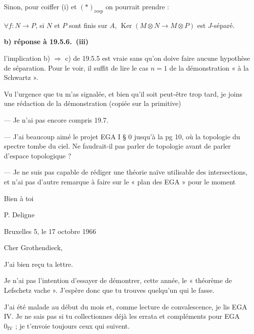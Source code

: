 \documentclass[11pt,a4paper]{article}
\begin{document}
Sinon, pour coiffer (i) et $(*)_{\mathrm{resp}}$ on pourrait prendre :

$\forall f : N \to P$, si $N$ et $P$ sont finis sur $A$,
$\operatorname{Ker}(M \otimes N \to M \otimes P)$ est $J$-séparé.
\marginal{!}


\textbf{b) réponse à 19.5.6.\ (iii)}

l'implication b) $\Rightarrow$ c) de 19.5.5 est vraie sans qu'on doive
faire aucune hypothèse de séparation. Pour le voir, il suffit de lire le
cas $n = 1$ de la démonstration « à la Schwartz ».

Vu l'urgence que tu m'as signalée, et bien qu'il soit peut-être trop tard,
je joins une rédaction de la démonstration (copiée sur la primitive)

--- Je n'ai pas encore compris 19.7.

--- J'ai beaucoup aimé le projet EGA I § 0 jusqu'à la pg 10, où la topologie
du spectre tombe du ciel. Ne faudrait-il pas parler de topologie avant de
parler d'espace topologique ?

--- Je ne suis pas capable de rédiger une théorie naïve utilisable des
intersections, et n'ai pas d'autre remarque à faire sur le « plan des EGA »
pour le moment

Bien à toi

P. Deligne


Bruxelles 5, le 17 octobre 1966

Cher Grothendieck,

J'ai bien reçu ta lettre.

Je n'ai pas l'intention d'essayer de démontrer, cette année, le « théorème
de Lefschetz vache ». J'espère donc que tu trouves quelqu'un qui le fasse.

J'ai été malade au début du mois et, comme lecture de convalescence, je lis
EGA IV. Je ne sais pas si tu collectionnes déjà les errata et compléments
pour EGA $0_{\mathrm{IV}}$ ; je t'envoie toujours ceux qui suivent.
\end{document}

